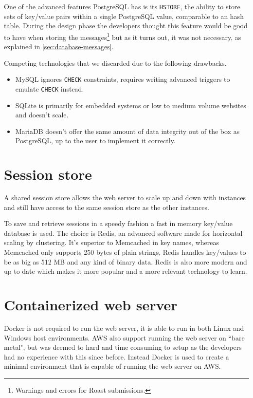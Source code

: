 \documentclass[12pt,a4paper]{report}
\begin{document}
One of the advanced features PostgreSQL has is its \texttt{HSTORE}, the ability to store sets of key/value pairs within a single PostgreSQL value\cite{pg-hstore}, comparable to an hash table. During the design phase the developers thought this feature would be good to have when storing the messages\footnote{Warnings and errors for Roast submissions.} but as it turns out, it was not necessary, as explained in \autoref{sec:database-messages}.

Competing technologies that we discarded due to the following drawbacks.
\begin{itemize}
    \item MySQL ignores \texttt{CHECK} constraints\cite{mysql-check-constraint}, requires writing advanced triggers to emulate \texttt{CHECK} instead\cite{mysql-emulate-check}.
    \item SQLite is primarily for embedded systems or low to medium volume websites and doesn't scale\cite{sqlite-when-to-use}.
    \item MariaDB doesn't offer the same amount of data integrity out of the box as \\ PostgreSQL\cite{mariadb-data-integrity}, up to the user to implement it correctly. 
\end{itemize}

\section{Session store}
A shared session store allows the web server to scale up and down with instances and still have access to the same session store as the other instances.

To save and retrieve sessions in a speedy fashion a fast in memory key/value database is used. The choice is Redis, an advanced software made for horizontal scaling by clustering. It's superior to Memcached in key names, whereas Memcached only supports 250 bytes of plain strings\cite{memcache-key-size}, Redis handles key/values to be as big as 512 MB\cite{redis-key-size} and any kind of binary data. Redis is also more modern and up to date which makes it more popular and a more relevant technology to learn\cite{key-value-comparison}\cite{redis-vs-memcached}.

\section{Containerized web server}
Docker\cite{why-docker} is not required to run the web server, it is able to run in both Linux and Windows host environments. AWS also support running the web server on ``bare metal", but was deemed to hard and time consuming to setup as the developers had no experience with this since before. Instead Docker is used to create a minimal environment that is capable of running the web server on AWS.
\end{document}

